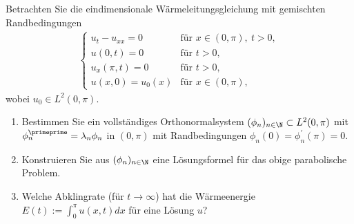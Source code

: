 
\begin{exercise}
Betrachten Sie die eindimensionale Wärmeleitungsgleichung mit gemischten Randbedingungen
\begin{align*}
  \begin{cases}
    u_t - u_{xx} = 0 & \text{für } x \in (0,\pi),\ t > 0, \\
    u(0,t) = 0 & \text{für } t > 0, \\
    u_x(\pi,t) = 0 & \text{für } t > 0, \\
    u(x,0) = u_0(x) & \text{für } x \in (0,\pi),
  \end{cases}
\end{align*}
wobei $u_0 \in L^2(0,\pi)$.
\begin{enumerate}[label = (\roman*)]
  \item Bestimmen Sie ein vollständiges Orthonormalsystem $(\phi_n)_{n \in \N} \subset L^2(0,\pi)$
  mit $\phi^{\primeprime}_n = \lambda_n\phi_n$ in $(0,\pi)$ mit Randbedingungen
  $\phi_n(0) = \phi_n^{\prime}(\pi) = 0.$
  \item Konstruieren Sie aus $(\phi_n)_{n \in \N}$ eine Lösungsformel für das
  obige parabolische Problem.
  \item Welche Abklingrate (für $t \to \infty$) hat die Wärmeenergie
  $E(t) := \int_0^{\pi} u(x,t) dx$ für eine Lösung $u$?
\end{enumerate}



\end{exercise}


\begin{solution}

\phantom{}

\end{solution}

